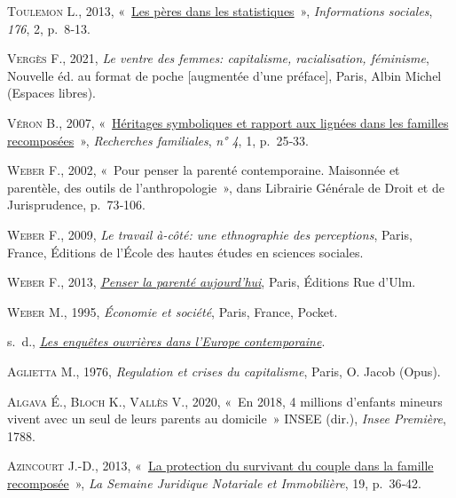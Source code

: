 \documentclass[
  12pt,
]{book}
\newlength{\cslhangindent}
\newenvironment{CSLReferences}[2] %
 {\begin{list}{}{%
  \setlength{\itemindent}{0pt}
  \setlength{\leftmargin}{0pt}
  \setlength{\parsep}{0pt}
  \ifodd #1
   \setlength{\leftmargin}{\cslhangindent}
   \setlength{\itemindent}{-1\cslhangindent}
  \fi
  \setlength{\itemsep}{#2\baselineskip}}}
 {\end{list}}
\begin{document}
\begin{CSLReferences}{0}{1}
\textsc{Toulemon L.}, 2013,
{«~\href{https://doi.org/10.3917/inso.176.0008}{Les pères dans les
statistiques}~»}, \emph{Informations sociales}, \emph{176}, 2, p.~8‑13.

\textsc{Vergès F.}, 2021, \emph{Le ventre des femmes: capitalisme,
racialisation, féminisme}, Nouvelle éd. au format de poche {[}augmentée
d'une préface{]}, Paris, Albin Michel (Espaces libres).

\textsc{Véron B.}, 2007,
{«~\href{http://www.cairn.info/revue-recherches-familiales-2007-1-page-25.htm}{Héritages
symboliques et rapport aux lignées dans les familles recomposées}~»},
\emph{Recherches familiales}, \emph{n° 4}, 1, p.~25‑33.

\textsc{Weber F.}, 2002, {«~Pour penser la parenté contemporaine.
Maisonnée et parentèle, des outils de l{'}anthropologie~»}, dans
Librairie Générale de Droit et de Jurisprudence, p.~73‑106.

\textsc{Weber F.}, 2009, \emph{Le travail à-côté: une ethnographie des
perceptions}, Paris, France, Éditions de l'École des hautes études en
sciences sociales.

\textsc{Weber F.}, 2013,
\emph{\href{http://www.cairn.info/penser-la-parente-aujourd-hui--9782728805013.htm}{Penser
la parenté aujourd'hui}}, Paris, Éditions Rue d'Ulm.

\textsc{Weber M.}, 1995, \emph{Économie et société}, Paris, France,
Pocket.

s.~d.,
\emph{\href{http://www.cairn.info/les-enquetes-ouvrieres-dans-l-europe-contemporaine--9782707199843.htm}{Les
enquêtes ouvrières dans l'Europe contemporaine}}.

\textsc{Aglietta M.}, 1976, \emph{Regulation et crises du capitalisme},
Paris, O. Jacob (Opus).

\textsc{Algava É.}, \textsc{Bloch K.}, \textsc{Vallès V.}, 2020, {«~En
2018, 4 millions d{'}enfants mineurs vivent avec un seul de leurs
parents au domicile~»} \textsc{INSEE} (dir.), \emph{Insee Première},
1788.

\textsc{Azincourt J.-D.}, 2013,
{«~\href{https://halshs.archives-ouvertes.fr/halshs-00825353}{La
protection du survivant du couple dans la famille recomposée}~»},
\emph{La Semaine Juridique Notariale et Immobilière}, 19, p.~36‑42.


\end{CSLReferences}
\end{document}
